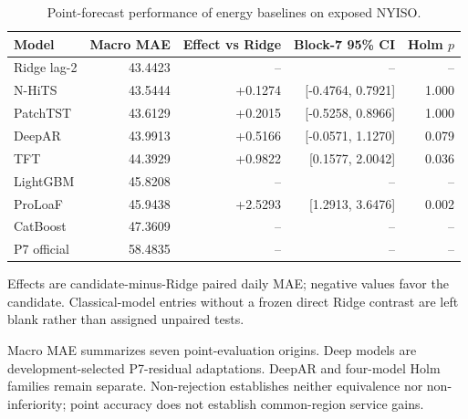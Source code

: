 
\begin{table}[!tbp]
\centering
\caption{Point-forecast performance of energy baselines on exposed NYISO.}
\label{tab:point}
\footnotesize
\setlength{\tabcolsep}{4pt}
\begin{tabular}{lrrrr}
\toprule
Model & Macro MAE & Effect vs Ridge & Block-7 95\% CI & Holm $p$ \\
\midrule
Ridge lag-2 & 43.4423 & -- & -- & -- \\
N-HiTS & 43.5444 & +0.1274 & [-0.4764, 0.7921] & 1.000 \\
PatchTST & 43.6129 & +0.2015 & [-0.5258, 0.8966] & 1.000 \\
DeepAR & 43.9913 & +0.5166 & [-0.0571, 1.1270] & 0.079 \\
TFT & 44.3929 & +0.9822 & [0.1577, 2.0042] & 0.036 \\
LightGBM & 45.8208 & -- & -- & -- \\
ProLoaF & 45.9438 & +2.5293 & [1.2913, 3.6476] & 0.002 \\
CatBoost & 47.3609 & -- & -- & -- \\
P7 official & 58.4835 & -- & -- & -- \\
\bottomrule
\end{tabular}
\par\footnotesize Effects are candidate-minus-Ridge paired daily MAE; negative values favor the candidate. Classical-model entries without a frozen direct Ridge contrast are left blank rather than assigned unpaired tests.
\par\footnotesize Macro MAE summarizes seven point-evaluation origins. Deep models are
development-selected P7-residual adaptations. DeepAR and four-model Holm
families remain separate. Non-rejection establishes neither equivalence nor
non-inferiority; point accuracy does not establish common-region service gains.
\end{table}
